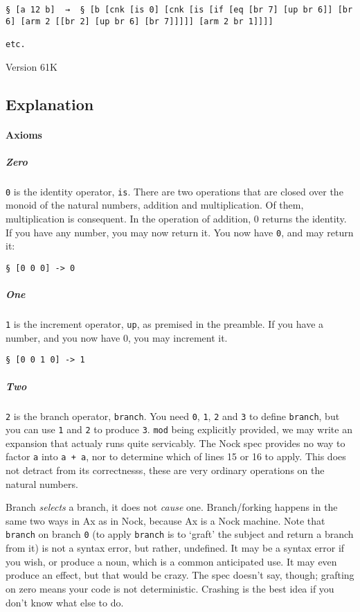 \documentclass[twoside]{article}
\begin{document}
\begin{lstlisting}[style=listingcode]
§ [a 12 b]  →  § [b [cnk [is 0] [cnk [is [if [eq [br 7] [up br 6]] [br 6] [arm 2 [[br 2] [up br 6] [br 7]]]]] [arm 2 br 1]]]]

etc.
\end{lstlisting}

Version 61K

\subsection{Explanation}

\paragraph{Axioms}

\subparagraph{Zero}

\texttt{0} is the identity operator, \texttt{is}. There are two operations that are closed over the monoid of the natural numbers, addition and multiplication. Of them, multiplication is consequent. In the operation of addition, 0 returns the identity. If you have any number, you may now return it. You now have \texttt{0}, and may return it:

\begin{lstlisting}[style=listingcode]
§ [0 0 0] -> 0
\end{lstlisting}

\subparagraph{One}

\texttt{1} is the increment operator, \texttt{up}, as premised in the preamble. If you have a number, and you now have 0, you may increment it. 

\begin{lstlisting}[style=listingcode]
§ [0 0 1 0] -> 1
\end{lstlisting}

\subparagraph{Two}

\texttt{2} is the branch operator, \texttt{branch}. You need \texttt{0}, \texttt{1}, \texttt{2} and \texttt{3} to define \texttt{branch}, but you can use \texttt{1} and \texttt{2} to produce \texttt{3}. \texttt{mod} being explicitly provided, we may write an expansion that actualy runs quite servicably. The Nock spec provides no way to factor \texttt{a} into \texttt{a + a}, nor to determine which of lines 15 or 16 to apply. This does not detract from its correctnesss, these are very ordinary operations on the natural numbers.

Branch \emph{selects} a branch, it does not \emph{cause} one. Branch/forking happens in the same two ways in Ax as in Nock, because Ax is a Nock machine. Note that \texttt{branch} on branch \texttt{0} (to apply \texttt{branch} is to `graft' the subject and return a branch from it) is not a syntax error, but rather, undefined. It may be a syntax error if you wish, or produce a noun, which is a common anticipated use. It may even produce an effect, but that would be crazy. The spec doesn't say, though; grafting on zero means your code is not deterministic. Crashing is the best idea if you don't know what else to do. 
\end{document}
